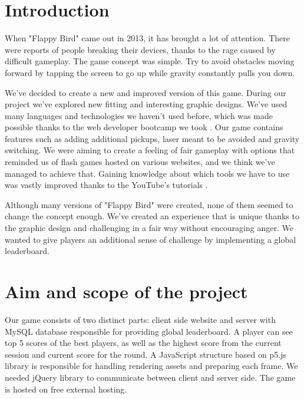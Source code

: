 \documentclass[oneside,a4paper,11pt]{report}
\begin{document}







\chapter{Introduction}
When "Flappy Bird" came out in 2013, it has brought a lot of attention. There were reports of people breaking their devices, thanks to the rage caused by difficult gameplay. The game concept was simple. Try to avoid obstacles moving forward by tapping the screen to go up while gravity constantly pulls you down.

\par
We've decided to create a new and improved version of this game. During our project we've explored new fitting and interesting graphic designs. We've used many languages and technologies we haven't used before, which was made possible thanks to the web developer bootcamp we took \cite{Bootcamp}. Our game contains features such as adding additional pickups, laser meant to be avoided and gravity switching. We were aiming to create a feeling of fair gameplay with options that reminded us of flash games hosted on various websites, and we think we've managed to achieve that. Gaining knowledge about which tools we have to use was vastly improved thanks to the
YouTube's tutorials \cite{CodingTrain} \cite{Phpcourse} \cite{ProgrammingwithMosh}.

\par
Although many versions of "Flappy Bird" were created, none of them seemed to change the concept enough. We've created an experience that is unique thanks to the graphic design and challenging in a fair way without encouraging anger. We wanted to give players an additional sense of challenge by implementing a global leaderboard.

\chapter{Aim and scope of the project}

Our game consists of two distinct parts: client side website and server with MySQL database responsible for providing global leaderboard. A player can see top 5 scores of the best players, as well as the highest score from the current session and current score for the round. A JavaScript structure based on p5.js library is responsible for handling rendering assets\cite{Blender} and preparing each frame. We needed jQuery library to communicate between client and server side. The game is hosted on free external hosting.
\end{document}
